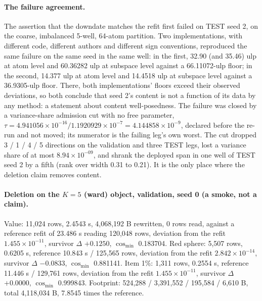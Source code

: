 \documentclass{article} %
\newcommand{\sci}[2]{\ensuremath{#1\times10^{#2}}}
\begin{document}
\paragraph{The failure agreement.} The assertion that the downdate matches the refit first failed on TEST seed 2, on the
coarse, imbalanced 5-well, 64-atom partition. Two implementations, with different code, different
authors and different sign conventions, reproduced the same failure on the same seed in the same
well: in the first, 32.90 (and 35.46) ulp at atom level and 60.36282 ulp at subspace level against
a 66.11072-ulp floor; in the second, 14.377 ulp at atom level and 14.4518 ulp at subspace level
against a 36.9305-ulp floor. There, both implementations' floors exceed their observed deviations,
so both conclude that seed 2's content is not a function of its data by any method: a statement
about content well-posedness. The failure was closed by a variance-share admission cut with no
free parameter, $\tau=4.941056\times10^{-16}/1.1920929\times10^{-7}=4.144858\times10^{-9}$,
declared before the re-run and not moved; its numerator is the failing leg's own worst.
The cut dropped 3 / 1 / 4 / 5 directions on the validation and three TEST legs, lost a variance
share of at most \sci{8.94}{-09}, and shrank the deployed span in one well of TEST seed 2 by a
fifth (rank over width 0.31 to 0.21). It is the only place where the deletion claim removes content.

\paragraph{Deletion on the $K=5$ (ward) object, validation, seed 0 (a smoke, not a claim).} Value:
11,024 rows, 2.4543 s, 4,068,192 B rewritten, 0 rows read, against a reference refit of 23.486 s
reading 120,048 rows, deviation from the refit \sci{1.455}{-11}, survivor $\Delta$ $+0.1250$, $\cos_{\min}$
0.183704. Red sphere: 5,507 rows, 0.6205 s, reference 10.843 s / 125,565 rows, deviation from the refit \sci{2.842}{-14}, survivor $\Delta$ $-0.0833$, $\cos_{\min}$ 0.881141. Item 1\%: 1,311 rows,
0.2554 s, reference 11.446 s / 129,761 rows, deviation from the refit \sci{1.455}{-11}, survivor $\Delta$
$+0.0000$, $\cos_{\min}$ 0.999843. Footprint: 524,288 / 3,391,552 / 195,584 / 6,610 B, total
4,118,034 B, 7.8545 times the reference. %

\end{document}
